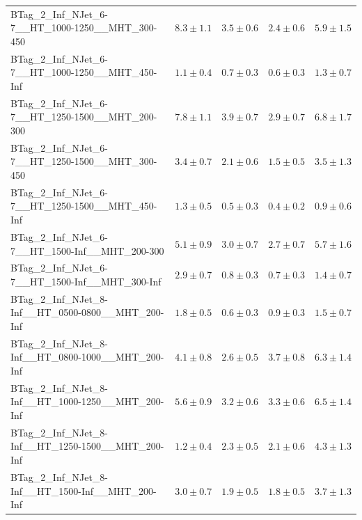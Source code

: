\documentclass{beamer}
\begin{document}
\begin{frame}
\begin{tabular}{lrrrr}
 BTag\_2\_Inf\_NJet\_6-7\_\_HT\_1000-1250\_\_MHT\_300-450 &               $8.3\pm1.1$&               $3.5\pm0.6$&               $2.4\pm0.6$&                   $5.9\pm1.5$ \\ 
 BTag\_2\_Inf\_NJet\_6-7\_\_HT\_1000-1250\_\_MHT\_450-Inf &               $1.1\pm0.4$&               $0.7\pm0.3$&               $0.6\pm0.3$&                   $1.3\pm0.7$ \\ 
 BTag\_2\_Inf\_NJet\_6-7\_\_HT\_1250-1500\_\_MHT\_200-300 &               $7.8\pm1.1$&               $3.9\pm0.7$&               $2.9\pm0.7$&                   $6.8\pm1.7$ \\ 
 BTag\_2\_Inf\_NJet\_6-7\_\_HT\_1250-1500\_\_MHT\_300-450 &               $3.4\pm0.7$&               $2.1\pm0.6$&               $1.5\pm0.5$&                   $3.5\pm1.3$ \\ 
 BTag\_2\_Inf\_NJet\_6-7\_\_HT\_1250-1500\_\_MHT\_450-Inf &               $1.3\pm0.5$&               $0.5\pm0.3$&               $0.4\pm0.2$&                   $0.9\pm0.6$ \\ 
  BTag\_2\_Inf\_NJet\_6-7\_\_HT\_1500-Inf\_\_MHT\_200-300 &               $5.1\pm0.9$&               $3.0\pm0.7$&               $2.7\pm0.7$&                   $5.7\pm1.6$ \\ 
  BTag\_2\_Inf\_NJet\_6-7\_\_HT\_1500-Inf\_\_MHT\_300-Inf &               $2.9\pm0.7$&               $0.8\pm0.3$&               $0.7\pm0.3$&                   $1.4\pm0.7$ \\ 
 BTag\_2\_Inf\_NJet\_8-Inf\_\_HT\_0500-0800\_\_MHT\_200-Inf &               $1.8\pm0.5$&               $0.6\pm0.3$&               $0.9\pm0.3$&                   $1.5\pm0.7$ \\ 
 BTag\_2\_Inf\_NJet\_8-Inf\_\_HT\_0800-1000\_\_MHT\_200-Inf &               $4.1\pm0.8$&               $2.6\pm0.5$&               $3.7\pm0.8$&                   $6.3\pm1.4$ \\ 
 BTag\_2\_Inf\_NJet\_8-Inf\_\_HT\_1000-1250\_\_MHT\_200-Inf &               $5.6\pm0.9$&               $3.2\pm0.6$&               $3.3\pm0.6$&                   $6.5\pm1.4$ \\ 
 BTag\_2\_Inf\_NJet\_8-Inf\_\_HT\_1250-1500\_\_MHT\_200-Inf &               $1.2\pm0.4$&               $2.3\pm0.5$&               $2.1\pm0.6$&                   $4.3\pm1.3$ \\ 
 BTag\_2\_Inf\_NJet\_8-Inf\_\_HT\_1500-Inf\_\_MHT\_200-Inf &               $3.0\pm0.7$&               $1.9\pm0.5$&               $1.8\pm0.5$&                   $3.7\pm1.3$ \\ 

\bottomrule 
\end{tabular}
\end{frame}
\end{document}
